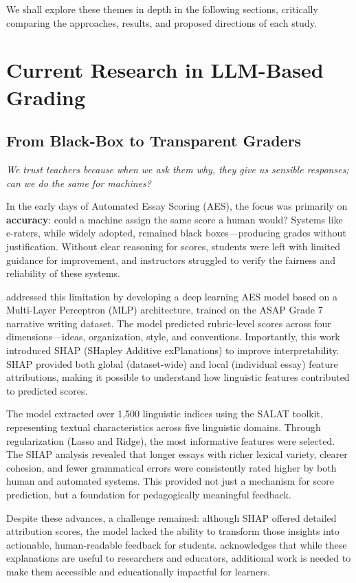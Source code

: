We shall explore these themes in depth in the following sections, critically comparing the approaches, results, and proposed directions of each study.

\chapter{Current Research in LLM-Based Grading}

\section{From Black-Box to Transparent Graders}
\textit{We trust teachers because when we ask them why, they give us sensible responses; can we do the same for machines?}

In the early days of Automated Essay Scoring (AES), the focus was primarily on \textbf{accuracy}: could a machine assign the same score a human would? Systems like e-raters, while widely adopted, remained black boxes—producing grades without justification. Without clear reasoning for scores, students were left with limited guidance for improvement, and instructors struggled to verify the fairness and reliability of these systems.

\citet{mok2023} addressed this limitation by developing a deep learning AES model based on a Multi-Layer Perceptron (MLP) architecture, trained on the ASAP Grade 7 narrative writing dataset. The model predicted rubric-level scores across four dimensions—ideas, organization, style, and conventions. Importantly, this work introduced SHAP (SHapley Additive exPlanations) to improve interpretability. SHAP provided both global (dataset-wide) and local (individual essay) feature attributions, making it possible to understand how linguistic features contributed to predicted scores.

The model extracted over 1,500 linguistic indices using the SALAT toolkit, representing textual characteristics across five linguistic domains. Through regularization (Lasso and Ridge), the most informative features were selected. The SHAP analysis revealed that longer essays with richer lexical variety, clearer cohesion, and fewer grammatical errors were consistently rated higher by both human and automated systems. This provided not just a mechanism for score prediction, but a foundation for pedagogically meaningful feedback.

Despite these advances, a challenge remained: although SHAP offered detailed attribution scores, the model lacked the ability to transform those insights into actionable, human-readable feedback for students. \citet{mok2023} acknowledges that while these explanations are useful to researchers and educators, additional work is needed to make them accessible and educationally impactful for learners.

